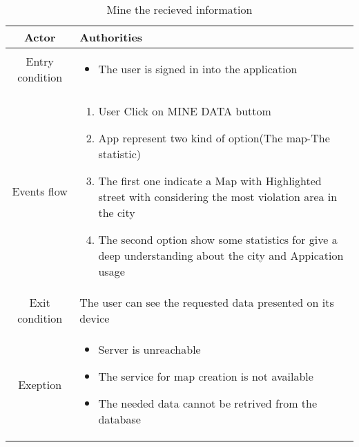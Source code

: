 \documentclass{article}
\begin{document}
		\begin{table} [H]
		\begin{center}
		\caption{Mine the recieved information}
		\begin{tabular}{|c|p{8cm}|}
			\hline
			Actor&Authorities\\
			\hline
			Entry condition& \begin{itemize}
								\item The user is signed in into the application
							\end{itemize}\\
			\hline
			 Events flow& \begin{enumerate}
							\item User Click on MINE DATA buttom 			
							\item App represent two kind of option(The map-The statistic)
							\item The first one indicate a Map with Highlighted street with considering the most violation area in the city
							\item The second option show some statistics for give a deep understanding about the city and Appication usage
						\end{enumerate}\\
			\hline
			Exit condition& The user can see the requested data presented on its device\\
			\hline
			Exeption& \begin{itemize}
						\item Server is unreachable
						\item The service for map creation is not available
						\item The needed data cannot be retrived from the database
					\end{itemize}\\
			\hline
		\end{tabular}
		\end{center}
		\end{table} 
\end{document}
